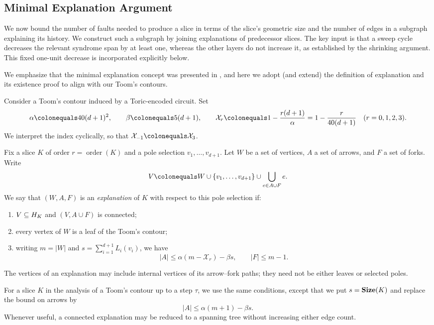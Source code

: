 \subsection{Minimal Explanation Argument}
\label{subsection:explantion}

We now bound the number of faults needed to produce a slice in terms of the
slice's geometric size and the number of edges in a subgraph explaining its
history. We construct such a subgraph by joining explanations of predecessor
slices. The key input is that a sweep cycle decreases the relevant syndrome
span by at least one, whereas the other layers do not increase it,
as established by the shrinking argument. This fixed one-unit decrease
is incorporated explicitly below. 



We emphasize that the minimal explanation concept was presented in \cite{Berman}, and here we adopt (and extend) the definition of explanation and its existence proof to align with our Toom's contours.
\begin{definition}
  \label{def:explantation}
  Consider a Toom's contour induced by a Toric-encoded circuit. Set
  \begin{equation*}
    \alpha \colonequals 40(d+1)^2, \qquad
    \beta \colonequals 5(d+1), \qquad
    \mathcal{X}_r \colonequals 1-\frac{r(d+1)}{\alpha}
    =1-\frac{r}{40(d+1)} \quad (r=0,1,2,3).
  \end{equation*}
  We interpret the index cyclically, so that
  $\mathcal{X}_{-1}\colonequals\mathcal{X}_3$.

  Fix a slice $K$ of order $r=\operatorname{order}(K)$ and a pole selection
  $v_1,\ldots,v_{d+1}$. Let $W$ be a set of vertices, $A$ a set of arrows,
  and $F$ a set of forks. Write
  \[
    V \colonequals W\cup\{v_1,\ldots,v_{d+1}\}
      \cup\bigcup_{e\in A\cup F}e.
  \]
  We say that $(W,A,F)$ is an \emph{explanation} of $K$ with respect to this
  pole selection if:
  \begin{enumerate}
    \item $V\subseteq H_{K}$ and $(V,A\cup F)$ is connected;
    \item every vertex of $W$ is a leaf of the Toom's contour;
    \item writing $m=|W|$ and
      $s=\sum_{i=1}^{d+1}L_i(v_i)$, we have
      \begin{equation*}
        |A|\leq\alpha(m-\mathcal{X}_r)-\beta s,
        \qquad |F|\leq m-1.
      \end{equation*}
  \end{enumerate}
  The vertices of an explanation may include internal vertices of its
  arrow--fork paths; they need not be either leaves or selected poles.

  For a slice $K$ in the analysis of a Toom's contour up to a step $\tau$,
  we use the same conditions, except that we put $s=\mathbf{Size}(K)$ and replace
  the bound on arrows by
  \begin{equation*}
    |A|\leq\alpha(m+1)-\beta s.
  \end{equation*}
  Whenever useful, a connected explanation may be reduced to a spanning
  tree without increasing either edge count.
\end{definition}

